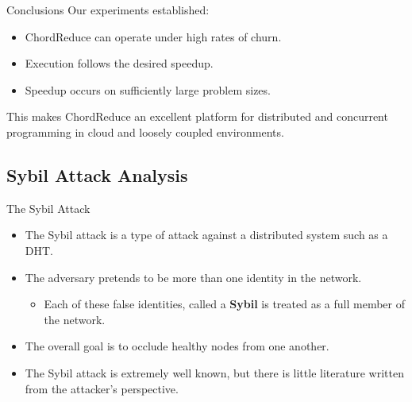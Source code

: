 \documentclass[11pt]{beamer}
\begin{document}
\begin{frame}{Conclusions}
Our experiments established:
\begin{itemize}
	\item ChordReduce can operate under high rates of churn.
	\item Execution follows the desired speedup.
	\item Speedup occurs on sufficiently large problem sizes.
\end{itemize}

This makes ChordReduce an excellent platform for distributed and concurrent programming in cloud and loosely coupled environments.

\end{frame}


\subsection{Sybil Attack Analysis}

\begin{frame}{The Sybil Attack}
	\begin{itemize}
		\item The Sybil attack is a type of attack against a distributed system such as a DHT.
		\item The adversary pretends to be more than one identity in the network.
		\begin{itemize}
			\item Each of these false identities, called a \textbf{Sybil} is treated as a full member of the network.
		\end{itemize}
		\item The overall goal is to occlude healthy nodes from one another.
		\item The Sybil attack is extremely well known, but there is little literature written from the attacker's perspective.
	\end{itemize}
	
\end{frame}
\end{document}
